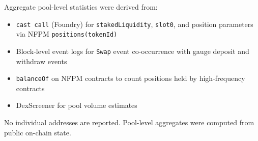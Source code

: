 \documentclass[11pt,a4paper]{article}
\theoremstyle{definition}
\begin{document}
Aggregate pool-level statistics were derived from:
\begin{itemize}[leftmargin=2em]
\item \texttt{cast call} (Foundry) for \texttt{stakedLiquidity}, \texttt{slot0}, and position parameters via NFPM \texttt{positions(tokenId)}
\item Block-level event logs for \texttt{Swap} event co-occurrence with gauge deposit and withdraw events
\item \texttt{balanceOf} on NFPM contracts to count positions held by high-frequency contracts
\item DexScreener for pool volume estimates
\end{itemize}

No individual addresses are reported. Pool-level aggregates were computed from public on-chain state.
\end{document}
